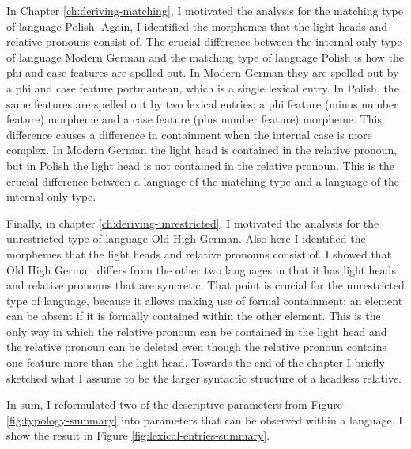 In Chapter \ref{ch:deriving-matching}, I motivated the analysis for the matching type of language Polish. Again, I identified the morphemes that the light heads and relative pronouns consist of. The crucial difference between the internal-only type of language Modern German and the matching type of language Polish is how the phi and case features are spelled out. In Modern German they are spelled out by a phi and case feature portmanteau, which is a single lexical entry. In Polish, the same features are spelled out by two lexical entries: a phi feature (minus number feature) morpheme and a case feature (plus number feature) morpheme. This difference causes a difference in containment when the internal case is more complex. In Modern German the light head is contained in the relative pronoun, but in Polish the light head is not contained in the relative pronoun. This is the crucial difference between a language of the matching type and a language of the internal-only type.

Finally, in chapter \ref{ch:deriving-unrestricted}, I motivated the analysis for the unrestricted type of language Old High German. Also here I identified the morphemes that the light heads and relative pronouns consist of. I showed that Old High German differs from the other two languages in that it has light heads and relative pronouns that are syncretic. That point is crucial for the unrestricted type of language, because it allows making use of formal containment: an element can be absent if it is formally contained within the other element. This is the only way in which the relative pronoun can be contained in the light head and the relative pronoun can be deleted even though the relative pronoun contains one feature more than the light head. Towards the end of the chapter I briefly sketched what I assume to be the larger syntactic structure of a headless relative.

In sum, I reformulated two of the descriptive parameters from Figure \ref{fig:typology-summary} into parameters that can be observed within a language. I show the result in Figure \ref{fig:lexical-entries-summary}.

